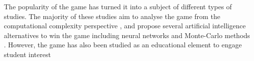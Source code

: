 The popularity of the game has turned it into a subject of different types of studies. The majority of these studies aim to analyse the game from the computational complexity perspective \citep{abdelkader20162048}, and propose several artificial intelligence alternatives to win the game including neural networks \citep{boris2016evolving} and Monte-Carlo methods \citep{rodgers2014investigation}. However, the game has also been studied as an educational element to engage student interest \citep{neller2015pedagogical}

